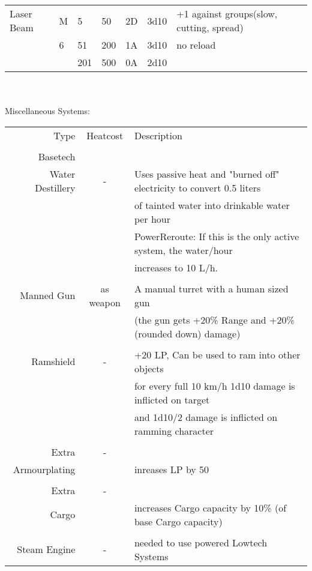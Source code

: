 \documentclass{article}
\begin{document}
 \begin{tabularx}{\textwidth}{p{2cm}p{0.4cm}p{0.5cm}@{ - }p{0.6cm}p{0.6cm}p{0.9cm}p{8cm}}\\\hline
Laser Beam&M   & 5  & 50            & 2D   & 3d10 & +1 against groups(slow, cutting, spread)\\
        &   6    & 51  & 200         & 1A   & 3d10 & no reload\\
        &       & 201 & 500          & 0A   & 2d10\\


\end{tabularx}\\\\

Miscellaneous Systems:\\
\begin{tabular}{rcl}
Type & Heatcost & Description\\
\\Basetech\\\hline
Water Destillery & -& Uses passive heat and "burned off" electricity to convert 0.5 liters \\
                 &  & of tainted water into drinkable water per hour\\
                 &  & PowerReroute: If this is the only active system, the water/hour\\&& increases to 10 L/h.\\\\
Manned Gun  & as weapon & A manual turret with a human sized gun \\&&(the gun gets +20\% Range and +20\% (rounded down) damage)\\\\
Ramshield & -       & +20 LP, Can be used to ram into other objects
                    \\&& for every full 10 km/h 1d10 damage is inflicted on target
                    \\&& and 1d10/2 damage is inflicted on ramming character\\\\
Extra & -       \\
Armourplating &   &   inreases LP by 50\\\\
Extra & - \\
Cargo & & increases Cargo capacity by 10\% (of base Cargo capacity)\\\\
Steam Engine & - & needed to use powered Lowtech Systems\\

\end{tabular}
\end{document}
